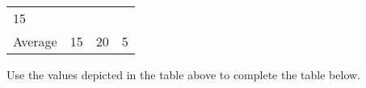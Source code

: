 \documentclass[]{article}
\begin{document}
\begin{longtable}[]{@{}llll@{}}
\begin{minipage}[t]{0.16\columnwidth}
15\strut
\end{minipage}\tabularnewline
\begin{minipage}[t]{0.20\columnwidth}\raggedright\strut
Average\strut
\end{minipage} & \begin{minipage}[t]{0.16\columnwidth}\raggedright\strut
15\strut
\end{minipage} & \begin{minipage}[t]{0.16\columnwidth}\raggedright\strut
20\strut
\end{minipage} & \begin{minipage}[t]{0.16\columnwidth}\raggedright\strut
5\strut
\end{minipage}\tabularnewline
\bottomrule
\end{longtable}

Use the values depicted in the table above to complete the table below.

\newpage
\end{document}
